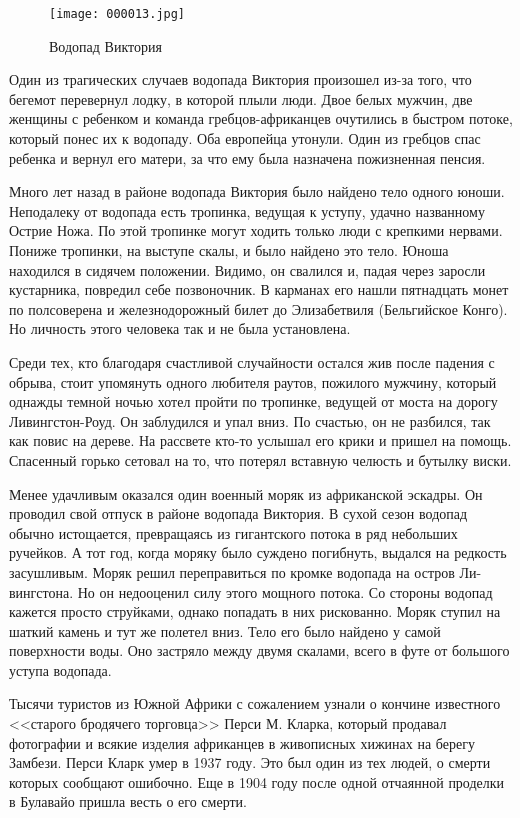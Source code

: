 \documentclass[12pt,a4paper,twoside,openany,svgnames]{memoir}
\begin{document}
\begin{figure}[ht!]
\centering
\texttt{[image: 000013.jpg]}
\caption{Водопад Виктория}
\label{overflow}
\end{figure}


Один из трагических случаев водопада Виктория произошел из-за того, что бегемот перевернул лодку, в которой плыли люди. Двое белых мужчин, две женщины с ребенком и команда гребцов-африканцев очутились в быстром потоке, который понес их к водопаду. Оба европейца утонули. Один из гребцов спас ребенка и вернул его матери, за что ему была назначена пожизненная пенсия.

Много лет назад в районе водопада Виктория было найдено тело одного юноши. Неподалеку от водопада есть тропинка, ведущая к уступу, удачно названному Острие Ножа. По этой тропинке могут ходить только люди с крепкими нервами. Пониже тропинки, на выступе скалы, и было найдено это тело. Юноша находился в сидячем положении. Видимо, он свалился и, падая через заросли кустарника, повредил себе позвоночник. В карманах его нашли пятнадцать монет по полсоверена и железнодорожный билет до Элизабетвиля (Бельгийское Конго). Но личность этого человека так и не была установлена.

Среди тех, кто благодаря счастливой случайности остался жив после падения с обрыва, стоит упомянуть одного любителя раутов, пожилого мужчину, который однажды темной ночью хотел пройти по тропинке, ведущей от моста на дорогу Ливингстон-Роуд. Он заблудился и упал вниз. По счастью, он не разбился, так как повис на дереве. На рассвете кто-то услышал его крики и пришел на помощь. Спасенный горько сетовал на то, что потерял вставную челюсть и бутылку виски.

Менее удачливым оказался один военный моряк из африканской эскадры. Он проводил свой отпуск в районе водопада Виктория. В сухой сезон водопад обычно истощается, превращаясь из гигантского потока в ряд небольших ручейков. А тот год, когда моряку было суждено погибнуть, выдался на редкость засушливым. Моряк решил переправиться по кромке водопада на остров Ли-вингстона. Но он недооценил силу этого мощного потока. Со стороны водопад кажется просто струйками, однако попадать в них рискованно. Моряк ступил на шаткий камень и тут же полетел вниз. Тело его было найдено у самой поверхности воды. Оно застряло между двумя скалами, всего в футе от большого уступа водопада.

Тысячи туристов из Южной Африки с сожалением узнали о кончине известного <<старого бродячего торговца>> Перси М. Кларка, который продавал фотографии и всякие изделия африканцев в живописных хижинах на берегу Замбези. Перси Кларк умер в 1937 году. Это был один из тех людей, о смерти которых сообщают ошибочно. Еще в 1904 году после одной отчаянной проделки в Булавайо пришла весть о его смерти.
\end{document}
